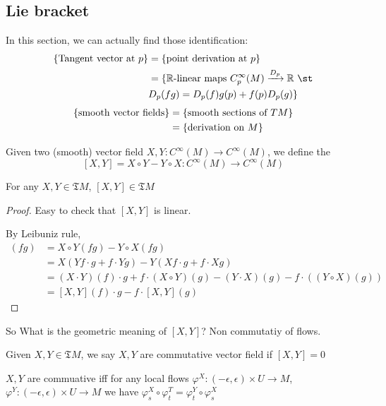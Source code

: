 \subsection{Lie bracket}
In this section, we can actually find those identification:
\begin{align*}
    \{\text{Tangent vector at $ p $}\}&=\{\text{point derivation at $ p $}\}\\
    &=\{\text{$ \mathbb{R} $-linear maps  $ C^\infty_p(M)\xrightarrow{D_p} \mathbb{R} $ \st}\\&D_p(fg)=D_p(f)g(p)+f(p)D_p(g)\}
\end{align*}
\begin{align*}
    \{\text{smooth vector fields}\}&=\{\text{smooth sections of  $ TM $}\}\\
    &=\{\text{derivation on  $ M $}\}
\end{align*}
\begin{definition}
    Given two (smooth) vector field  $ X,Y:C^\infty(M)\rightarrow C^\infty(M) $, we define the 
    \[[X,Y]=X\circ Y-Y\circ X:C^\infty(M)\rightarrow C^\infty(M)\] 
\end{definition}
\begin{theorem}
    For any  $ X,Y\in\mathfrak{T}M $,  $ [X,Y]\in \mathfrak{T}M $  
\end{theorem}
\begin{proof}
    Easy to check that  $ [X,Y] $ is linear.
    
    By Leibuniz rule,
    \begin{align*}
        [X,Y](fg)&=X\circ Y(fg)-Y\circ X(fg)\\
        &=X(Yf\cdot g+f\cdot Yg)-Y(Xf\cdot g+f\cdot Xg)\\
        &=(X\cdot Y)(f)\cdot g+f\cdot(X\circ Y)(g)-(Y\cdot X)(g)-f\cdot ((Y\circ X)(g))\\
        &=[X,Y](f)\cdot g- f\cdot [X,Y](g)
    \end{align*}
\end{proof}
So What is the geometric meaning of  $ [X,Y] $? Non commutatiy of flows.
\begin{fact}
    Given  $ X,Y\in \mathfrak{T}M $, we say  $ X,Y $ are commutative vector field if  $ [X,Y]=0 $
    
    $ X,Y $ are commuative iff  for any local flows  $ \varphi^X:(-\epsilon,\epsilon)\times U\rightarrow M $, $ \varphi^Y:(-\epsilon,\epsilon)\times U\rightarrow M $  we have $ \varphi_s^X\circ \varphi_t^T=\varphi_t^Y\circ\varphi_s^X $   
\end{fact} 


